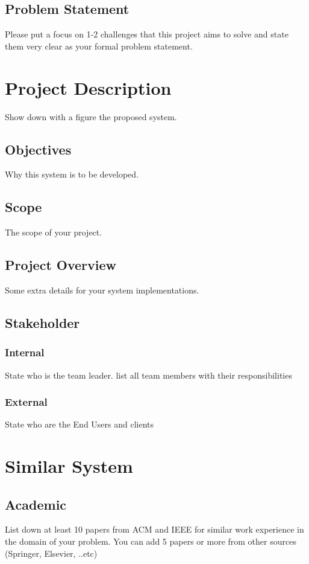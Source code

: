 \documentclass[12pt]{article}
\begin{document}
\subsection{Problem Statement}
Please put a focus on 1-2 challenges that this project aims to solve and state them very clear as your formal problem statement.

\section{Project Description}
Show down with a figure the proposed system.
\subsection{Objectives}
Why this system is to be developed.
\subsection{Scope}
The scope of your project.
\subsection{Project Overview}
Some extra details for your system implementations.
\subsection{Stakeholder}
\subsubsection{Internal}
State who is the team leader. list all team members with their responsibilities
\subsubsection{External}
State who are the End Users and clients

\section{Similar System}
\subsection{Academic}

List down at least 10 papers from ACM and IEEE for similar work experience in the domain of your problem. You can add 5 papers or more from other sources (Springer, Elsevier,  ..etc)
\end{document}
